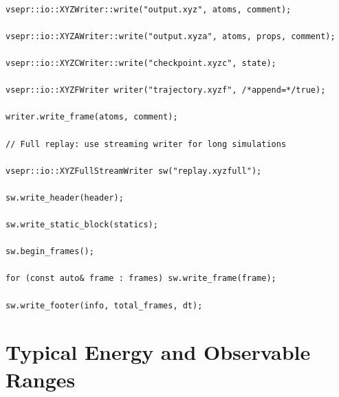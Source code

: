 \documentclass[12pt, a4paper, oneside]{article}
\begin{document}
\begin{lstlisting}

vsepr::io::XYZWriter::write("output.xyz", atoms, comment);

vsepr::io::XYZAWriter::write("output.xyza", atoms, props, comment);

vsepr::io::XYZCWriter::write("checkpoint.xyzc", state);

vsepr::io::XYZFWriter writer("trajectory.xyzf", /*append=*/true);

writer.write_frame(atoms, comment);

// Full replay: use streaming writer for long simulations

vsepr::io::XYZFullStreamWriter sw("replay.xyzfull");

sw.write_header(header);

sw.write_static_block(statics);

sw.begin_frames();

for (const auto& frame : frames) sw.write_frame(frame);

sw.write_footer(info, total_frames, dt);

\end{lstlisting}



\section{Typical Energy and Observable Ranges}

\label{sec:ranges}

\end{document}
